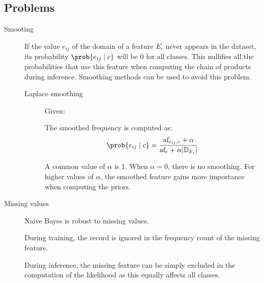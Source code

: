 \subsection{Problems}
\begin{description}
    \item[Smooting] 
        If the value $e_{ij}$ of the domain of a feature $E_i$ never appears in the dataset, 
        its probability $\prob{e_{ij} \mid c}$ will be 0 for all classes.
        This nullifies all the probabilities that use this feature when 
        computing the chain of products during inference.
        Smoothing methods can be used to avoid this problem.

        \begin{description}
            \item[Laplace smoothing] 
                Given:
                The smoothed frequency is computed as:
                \[
                    \prob{e_{ij} \mid c} = \frac{\text{af}_{e_{ij}, c} + \alpha}{\text{af}_{c} + \alpha \vert \mathbb{D}_{E_i} \vert}    
                \]

                A common value of $\alpha$ is 1.
                When $\alpha = 0$, there is no smoothing.
                For higher values of $\alpha$, the smoothed feature gains more importance when computing the priors.
        \end{description}

    \item[Missing values] 
        Naive Bayes is robust to missing values.

        During training, the record is ignored in the frequency count of the missing feature.

        During inference, the missing feature can be simply excluded in the computation of the likelihood
        as this equally affects all classes.


\end{description}
